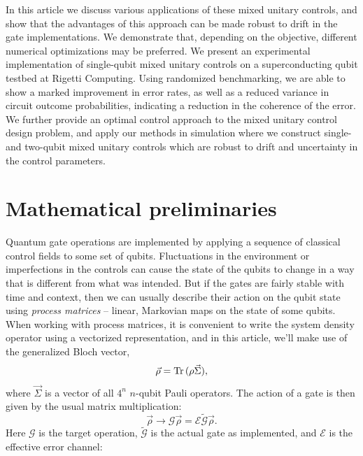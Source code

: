 \documentclass[aps,nofootinbib,pra,notitlepage,twocolumn]{revtex4-1}
\newcommand{\tr}{{\rm Tr\thinspace}}
\newcommand{\actual}{\ensuremath{\tilde{\mathcal{G}}}}
\newcommand{\target}{\ensuremath{{\mathcal{G}}}}
\newcommand{\error}{\ensuremath{{\mathcal{E}}}}
\begin{document}

In this article we discuss various applications of these mixed unitary controls, and show that the advantages of this approach can be made robust to drift in the gate implementations. We demonstrate that, depending on the objective, different numerical optimizations may be preferred. We present an experimental implementation of single-qubit mixed unitary controls on a superconducting qubit testbed at Rigetti Computing. Using randomized benchmarking, we are able to show a marked improvement in error rates, as well as a reduced variance in circuit outcome probabilities, indicating a reduction in the coherence of the error. We further provide an optimal control approach to the mixed unitary control design problem, and apply our methods in simulation where we construct single- and two-qubit mixed unitary controls which are robust to drift and uncertainty in the control parameters.   

\section{Mathematical preliminaries}
\label{sec:representing_quantum_gates}
Quantum gate operations are implemented by applying a sequence of classical control fields to some set of qubits. Fluctuations in the environment or imperfections in the controls can cause the state of the qubits to change in a way that is different from what was intended.  But if the gates are fairly stable with time and context\cite{1810.05651}, then we can usually describe their action on the qubit state using \emph{process matrices} -- linear, Markovian maps on the state of some qubits.  When working with process matrices, it is convenient to write the system density operator using a vectorized representation, and in this article, we'll make use of the generalized Bloch vector,
\begin{equation}
  \vec \rho = \tr(\rho \vec \Sigma),
\end{equation}
where $\vec \Sigma$ is a vector of all $4^n$ $n$-qubit Pauli operators. The action of a gate is then given by the usual matrix multiplication:
\begin{equation}\label{error_def}
  \vec\rho \rightarrow \target\vec\rho = \error \actual \vec\rho.
\end{equation}
Here $\target$ is the target operation, $\actual$ is the actual gate as implemented, and $\error$ is the effective error channel:
\end{document}

